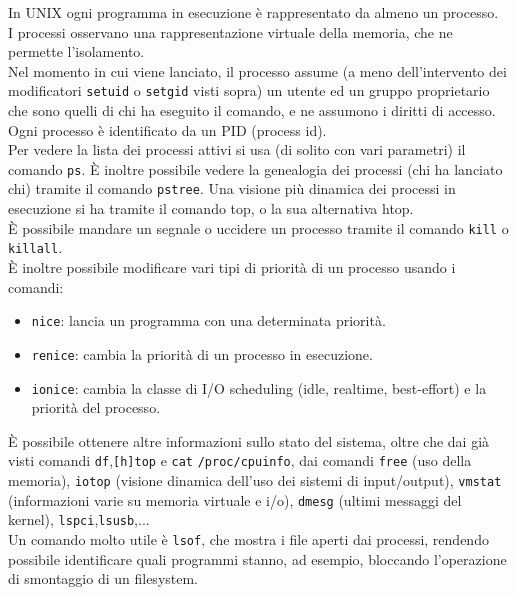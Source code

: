 \documentclass[a4paper]{report}
\begin{document}
In UNIX ogni programma in esecuzione è rappresentato da almeno un processo.
\\I processi osservano una rappresentazione virtuale della memoria, che ne permette l'isolamento.
\\Nel momento in cui viene lanciato, il processo assume (a meno dell'intervento dei modificatori
\texttt{setuid} o \texttt{setgid} visti sopra) un utente ed un gruppo proprietario che sono quelli di chi ha eseguito
il comando, e ne assumono i diritti di accesso.
\\Ogni processo è identificato da un PID (process id).
\\Per vedere la lista dei processi attivi si usa (di solito con vari parametri) il comando \texttt{ps}. È inoltre
possibile vedere la genealogia dei processi (chi ha lanciato chi) tramite il comando \texttt{pstree}. Una
visione più dinamica dei processi in esecuzione si ha tramite il comando top, o la sua alternativa
htop.
\\È possibile mandare un segnale o uccidere un processo tramite il comando \texttt{kill} o \texttt{killall}.
\\È inoltre possibile modificare vari tipi di priorità di un processo usando i comandi:
\begin{itemize}
\item \texttt{nice}: lancia un programma con una determinata priorità.
\item \texttt{renice}: cambia la priorità di un processo in esecuzione.
\item \texttt{ionice}: cambia la classe di I/O scheduling (idle, realtime, best-effort) e la priorità del processo.
\end{itemize}
È possibile ottenere altre informazioni sullo stato del sistema, oltre
che dai già visti comandi \texttt{df},\texttt{[h]top} e \texttt{cat} \texttt{/proc/cpuinfo},
dai comandi \texttt{free} (uso della memoria), \texttt{iotop} (visione dinamica
dell'uso dei sistemi di input/output), \texttt{vmstat} (informazioni varie su
memoria virtuale e i/o), \texttt{dmesg} (ultimi messaggi del kernel),
\texttt{lspci},\texttt{lsusb},...\\
Un comando molto utile è \texttt{lsof}, che mostra i file aperti dai
processi, rendendo possibile identificare quali programmi stanno, ad
esempio, bloccando l'operazione di smontaggio di un filesystem.\\
\end{document}
